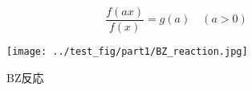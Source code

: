 \documentclass[autodetect-engine,dvipdfmx-if-dvi,a4paper,ja=standard]{bxjsbook}
\begin{document}
\begin{equation}
  \frac{f(ax)}{f(x)}=g(a) \quad (a>0)
\end{equation}
\begin{figure}[htbp]
  \centering
  \texttt{[image: ../test\_fig/part1/BZ\_reaction.jpg]}
  \caption{BZ反応\cite{BZ}\cite{elements}}
\end{figure}

\printbibliography[title=参考文献] %
\end{document}
